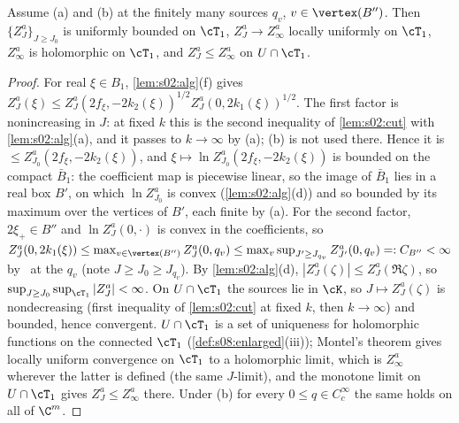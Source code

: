 \begin{lemma}\label{lem:s08:W1}
Assume \Wtwo(a) and \Wtwo(b) at the finitely many sources $q_v$, $v\in\vertex(B'')$. Then $\{Z^a_J\}_{J\ge J_0}$ is uniformly bounded on $\cT_1$, $Z^a_J\to Z^a_\infty$ locally uniformly on $\cT_1$, $Z^a_\infty$ is holomorphic on $\cT_1$, and $Z^a_J\le Z^a_\infty$ on $U\cap\cT_1$.
\end{lemma}

\begin{proof}
For real $\xi\in B_1$, \cref{lem:s02:alg}(f) gives $Z^a_J(\xi)\le Z^a_J(2f_\xi,-2k_2(\xi))^{1/2}Z^a_J(0,2k_1(\xi))^{1/2}$. The first factor is nonincreasing in $J$: at fixed $k$ this is the second inequality of \cref{lem:s02:cut} with \cref{lem:s02:alg}(a), and it passes to $k\to\infty$ by \Wtwo(a); \Wtwo(b) is not used there. Hence it is $\le Z^a_{J_0}(2f_\xi,-2k_2(\xi))$, and $\xi\mapsto\ln Z^a_{J_0}(2f_\xi,-2k_2(\xi))$ is bounded on the compact $\bar B_1$: the coefficient map is piecewise linear, so the image of $\bar B_1$ lies in a real box $B'$, on which $\ln Z^a_{J_0}$ is convex (\cref{lem:s02:alg}(d)) and so bounded by its maximum over the vertices of $B'$, each finite by \Wtwo(a). For the second factor, $2\xi_+\in B''$ and $\ln Z^a_J(0,\cdot)$ is convex in the coefficients, so $Z^a_J(0,2k_1(\xi))\le\max_{v\in\vertex(B'')}Z^a_J(0,q_v)\le\max_v\sup_{J'\ge J_{q_v}}Z^a_{J'}(0,q_v)=: C_{B''}<\infty$ by \Wtwo\ at the $q_v$ (note $J\ge J_0\ge J_{q_v}$). By \cref{lem:s02:alg}(d), $|Z^a_J(\zeta)|\le Z^a_J(\Re\zeta)$, so $\sup_{J\ge J_0}\sup_{\cT_1}|Z^a_J|<\infty$. On $U\cap\cT_1$ the sources lie in $\cK$, so $J\mapsto Z^a_J(\zeta)$ is nondecreasing (first inequality of \cref{lem:s02:cut} at fixed $k$, then $k\to\infty$) and bounded, hence convergent. $U\cap\cT_1$ is a set of uniqueness for holomorphic functions on the connected $\cT_1$ (\cref{def:s08:enlarged}(iii)); Montel's theorem gives locally uniform convergence on $\cT_1$ to a holomorphic limit, which is $Z^a_\infty$ wherever the latter is defined (the same $J$-limit), and the monotone limit on $U\cap\cT_1$ gives $Z^a_J\le Z^a_\infty$ there. Under \Wtwo(b) for every $0\le q\in C^\infty_c$ the same holds on all of $\C^m$.
\end{proof}


